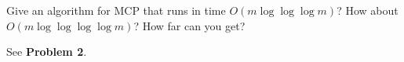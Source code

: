 \documentclass[11pt,a4paper,oneside]{article}
\begin{document}
\begin{problem}{3}
	\statement
	Give an algorithm for MCP that runs in time $O(m \log \log \log m)$? How about $O(m \log \log \log \log m)$? How far can you get?
	
	\solution
	
	See \textbf{Problem 2}.

\end{problem}
\end{document}
